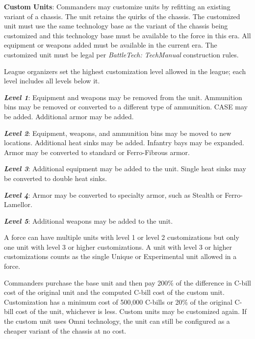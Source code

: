 \item {\bfseries Custom Units}: Commanders may customize units by refitting an existing variant of a chassis.
The unit retains the quirks of the chassis.
The customized unit must use the same technology base as the variant of the chassis being customized and this technology base must be available to the force in this era.
All equipment or weapons added must be available in the current era.
The customized unit must be legal per \emph{BattleTech: TechManual} construction rules.

League organizers set the highest customization level allowed in the league; each level includes all levels below it.

\begin{description}

\item \emph{\bfseries Level 1}: Equipment and weapons may be removed from the unit.
Ammunition bins may be removed or converted to a different type of ammunition.
CASE may be added.
Additional armor may be added.

\item \emph{\bfseries Level 2}: Equipment, weapons, and ammunition bins may be moved to new locations.
Additional heat sinks may be added.
Infantry bays may be expanded.
Armor may be converted to standard or Ferro-Fibrous armor.

\item \emph{\bfseries Level 3}: Additional equipment may be added to the unit.
Single heat sinks may be converted to double heat sinks.

\item \emph{\bfseries Level 4}: Armor may be converted to specialty armor, such as Stealth or Ferro-Lamellor.

\item \emph{\bfseries Level 5}: Additional weapons may be added to the unit.

\end{description}

A force can have multiple units with level 1 or level 2 customizations but only one unit with level 3 or higher customizations.
A unit with level 3 or higher customizations counts as the single Unique or Experimental unit allowed in a force.

Commanders purchase the base unit and then pay 200\% of the difference in C-bill cost of the original unit and the computed C-bill cost of the custom unit.
Customization has a minimum cost of 500,000 C-bills or 20\% of the original C-bill cost of the unit, whichever is less.
Custom units may be customized again.
If the custom unit uses Omni technology, the unit can still be configured as a cheaper variant of the chassis at no cost.

